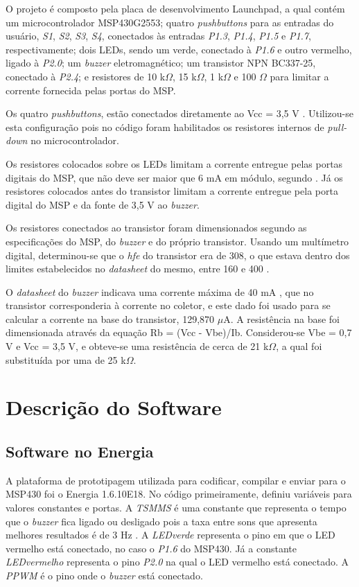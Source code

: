 \documentclass[conference]{IEEEtran}
\begin{document}
O projeto é composto pela placa de desenvolvimento Launchpad, a qual contém um microcontrolador MSP430G2553; quatro \emph{pushbuttons} para as entradas do usuário, \emph{S1}, \emph{S2}, \emph{S3}, \emph{S4}, conectados às entradas \emph{P1.3}, \emph{P1.4}, \emph{P1.5} e \emph{P1.7}, respectivamente; dois LEDs, sendo um verde, conectado à \emph{P1.6} e outro vermelho, ligado à \emph{P2.0}; um \emph{buzzer} eletromagnético; um transistor NPN BC337-25, conectado à \emph{P2.4}; e resistores de 10 k$\Omega$, 15 k$\Omega$, 1 k$\Omega$ e 100 $\Omega$ para limitar a corrente fornecida pelas portas do MSP.

Os quatro \emph{pushbuttons}, estão conectados diretamente ao Vcc = 3,5 V . Utilizou-se esta configuração pois no código foram habilitados os resistores internos de \emph{pull-down} no microcontrolador.

Os resistores colocados sobre os LEDs limitam a corrente entregue pelas portas digitais do MSP, que não deve ser maior que 6 mA em módulo, segundo \cite{datamsp}. Já os resistores colocados antes do transistor limitam a corrente entregue pela porta digital do MSP e da fonte de 3,5 V ao \emph{buzzer}.

Os resistores conectados ao transistor foram dimensionados segundo as especificações do MSP, do \emph{buzzer} e do próprio transistor. Usando um multímetro digital, determinou-se que o \emph{hfe} do transistor era de 308, o que estava dentro dos limites estabelecidos no \emph{datasheet} do mesmo, entre 160 e 400 \cite{databc337}.

O \emph{datasheet} do \emph{buzzer} indicava uma corrente máxima de 40 mA \cite{databuzzer}, que no transistor corresponderia à corrente no coletor, e este dado foi usado para se calcular a corrente na base do transistor, 129,870 $\mu$A. A resistência na base foi dimensionada através da equação Rb = (Vcc - Vbe)/Ib. Considerou-se Vbe = 0,7 V e Vcc = 3,5 V, e obteve-se uma resistência de cerca de 21 k$\Omega$, a qual foi substituída por uma de 25 k$\Omega$.


\section{Descrição do Software}

\subsection{Software no Energia}

A plataforma de prototipagem utilizada para codificar, compilar e enviar para o MSP430 foi o Energia 1.6.10E18. No código primeiramente, definiu variáveis para valores constantes e portas. A \emph{TSMMS} é uma constante que representa o tempo que o \emph{buzzer} fica ligado ou desligado pois a taxa entre sons que apresenta melhores resultados é de 3 Hz \cite{pelosin}. A \emph{LEDverde} representa o pino em que o LED vermelho está conectado, no caso o \emph{P1.6} do MSP430. Já a constante \emph{LEDvermelho} representa o pino \emph{P2.0} na qual o LED vermelho está conectado. A \emph{PPWM} é o pino onde o \emph{buzzer} está conectado.
\end{document}
